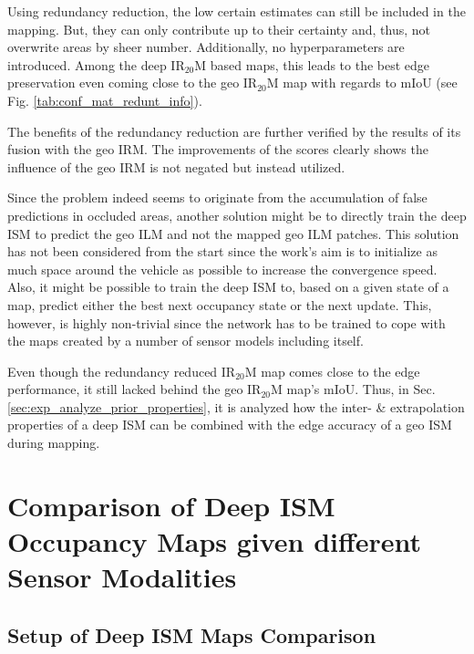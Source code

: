 Using redundancy reduction, the low certain estimates can still be included in the mapping. But, they can only contribute up to their certainty and, thus, not overwrite areas by sheer number. Additionally, no hyperparameters are introduced. Among the deep IR$_{20}$M based maps, this leads to the best edge preservation even coming close to the geo IR$_{20}$M map with regards to mIoU (see Fig. \ref{tab:conf_mat_redunt_info}).

The benefits of the redundancy reduction are further verified by the results of its fusion with the geo IRM. The improvements of the scores clearly shows the influence of the geo IRM is not negated but instead utilized.

Since the problem indeed seems to originate from the accumulation of false predictions in occluded areas, another solution might be to directly train the deep ISM to predict the geo ILM and not the mapped geo ILM patches. This solution has not been considered from the start since the work's aim is to initialize as much space around the vehicle as possible to increase the convergence speed. Also, it might be possible to train the deep ISM to, based on a given state of a map, predict either the best next occupancy state or the next update. This, however, is highly non-trivial since the network has to be trained to cope with the maps created by a number of sensor models including itself. 

Even though the redundancy reduced IR$_{20}$M map comes close to the edge performance, it still lacked behind the geo IR$_{20}$M map's mIoU. Thus, in Sec. \ref{sec:exp_analyze_prior_properties}, it is analyzed how the inter- \& extrapolation properties of a deep ISM can be combined with the edge accuracy of a geo ISM during mapping.
%
\section{Comparison of Deep ISM Occupancy Maps given different Sensor Modalities}
\label{sec:exp_comparison_deep_ism_maps_diff_sensors}
%
\subsection{Setup of Deep ISM Maps Comparison}
\label{subsec:setup_analyze_deep_ism_maps_diff_sensors}
%
